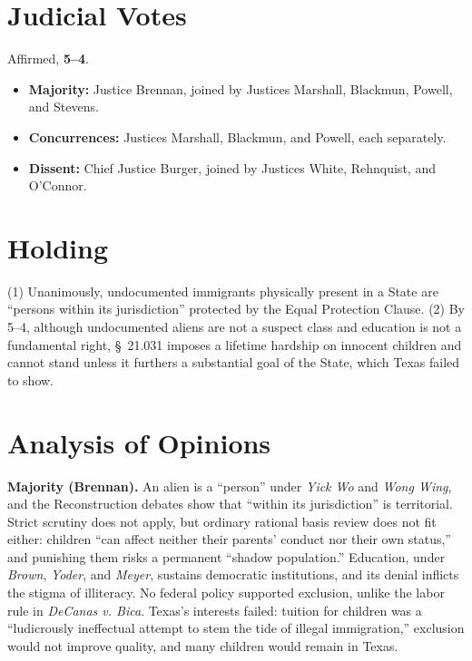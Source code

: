 \documentclass[12pt]{article}
\begin{document}
\section{Judicial Votes}

Affirmed, \textbf{5--4}.
\begin{itemize}
\item \textbf{Majority:} Justice Brennan, joined by Justices Marshall, Blackmun, Powell, and Stevens.
\item \textbf{Concurrences:} Justices Marshall, Blackmun, and Powell, each separately.
\item \textbf{Dissent:} Chief Justice Burger, joined by Justices White, Rehnquist, and O'Connor.
\end{itemize}

\section{Holding}

(1) Unanimously, undocumented immigrants physically present in a State are ``persons within its jurisdiction'' protected by the Equal Protection Clause. (2) By 5--4, although undocumented aliens are not a suspect class and education is not a fundamental right, \S~21.031 imposes a lifetime hardship on innocent children and cannot stand unless it furthers a substantial goal of the State, which Texas failed to show.

\section{Analysis of Opinions}

\textbf{Majority (Brennan).} An alien is a ``person'' under \textit{Yick Wo} and \textit{Wong Wing}, and the Reconstruction debates show that ``within its jurisdiction'' is territorial. Strict scrutiny does not apply, but ordinary rational basis review does not fit either: children ``can affect neither their parents' conduct nor their own status,'' and punishing them risks a permanent ``shadow population.'' Education, under \textit{Brown}, \textit{Yoder}, and \textit{Meyer}, sustains democratic institutions, and its denial inflicts the stigma of illiteracy. No federal policy supported exclusion, unlike the labor rule in \textit{DeCanas v. Bica}. Texas's interests failed: tuition for children was a ``ludicrously ineffectual attempt to stem the tide of illegal immigration,'' exclusion would not improve quality, and many children would remain in Texas.
\end{document}
